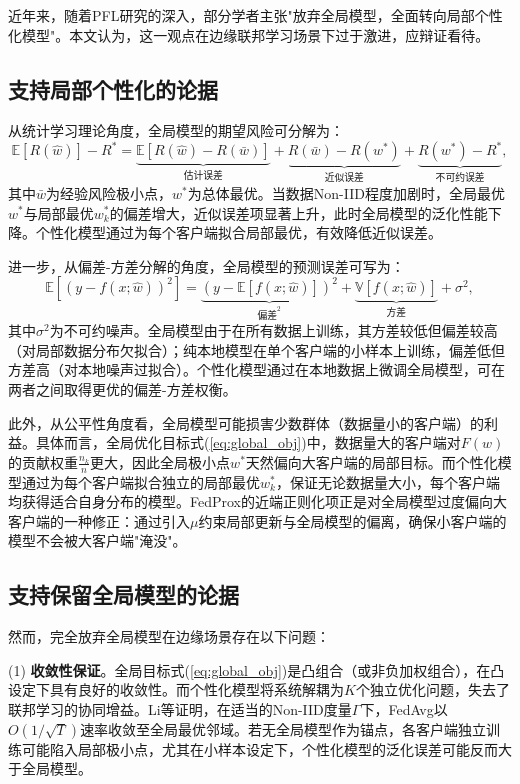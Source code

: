 \documentclass[a4paper,12pt]{article}
\begin{document}
近年来，随着PFL研究的深入，部分学者主张"放弃全局模型，全面转向局部个性化模型"。本文认为，这一观点在边缘联邦学习场景下过于激进，应辩证看待。

\subsection{支持局部个性化的论据}

从统计学习理论角度，全局模型的期望风险可分解为：
\begin{equation}
\mathbb{E}[R(\hat{w})] - R^* = \underbrace{\mathbb{E}[R(\hat{w}) - R(\bar{w})]}_{\text{估计误差}} + \underbrace{R(\bar{w}) - R(w^*)}_{\text{近似误差}} + \underbrace{R(w^*) - R^*}_{\text{不可约误差}},
\label{eq:risk_decomp}
\end{equation}
其中$\bar{w}$为经验风险极小点，$w^*$为总体最优。当数据Non-IID程度加剧时，全局最优$w^*$与局部最优$w_k^*$的偏差增大，近似误差项显著上升，此时全局模型的泛化性能下降。个性化模型通过为每个客户端拟合局部最优，有效降低近似误差。

进一步，从偏差-方差分解的角度，全局模型的预测误差可写为：
\begin{equation}
\mathbb{E}\left[(y - f(x; \hat{w}))^2\right] = \underbrace{(y - \mathbb{E}[f(x; \hat{w})])^2}_{\text{偏差}^2} + \underbrace{\mathbb{V}[f(x; \hat{w})]}_{\text{方差}} + \sigma^2,
\end{equation}
其中$\sigma^2$为不可约噪声。全局模型由于在所有数据上训练，其方差较低但偏差较高（对局部数据分布欠拟合）；纯本地模型在单个客户端的小样本上训练，偏差低但方差高（对本地噪声过拟合）。个性化模型通过在本地数据上微调全局模型，可在两者之间取得更优的偏差-方差权衡。

此外，从公平性角度看，全局模型可能损害少数群体（数据量小的客户端）的利益。具体而言，全局优化目标式(\ref{eq:global_obj})中，数据量大的客户端对$F(w)$的贡献权重$\frac{n_k}{n}$更大，因此全局极小点$w^*$天然偏向大客户端的局部目标。而个性化模型通过为每个客户端拟合独立的局部最优$w_k^*$，保证无论数据量大小，每个客户端均获得适合自身分布的模型。FedProx\cite{li2020federated}的近端正则化项正是对全局模型过度偏向大客户端的一种修正：通过引入$\mu$约束局部更新与全局模型的偏离，确保小客户端的模型不会被大客户端"淹没"。

\subsection{支持保留全局模型的论据}

然而，完全放弃全局模型在边缘场景存在以下问题：

(1) \textbf{收敛性保证}。全局目标式(\ref{eq:global_obj})是凸组合（或非负加权组合），在凸设定下具有良好的收敛性。而个性化模型将系统解耦为$K$个独立优化问题，失去了联邦学习的协同增益。Li等\cite{li2020convergence}证明，在适当的Non-IID度量$\Gamma$下，FedAvg以$O(1/\sqrt{T})$速率收敛至全局最优邻域。若无全局模型作为锚点，各客户端独立训练可能陷入局部极小点，尤其在小样本设定下，个性化模型的泛化误差可能反而大于全局模型。
\end{document}
